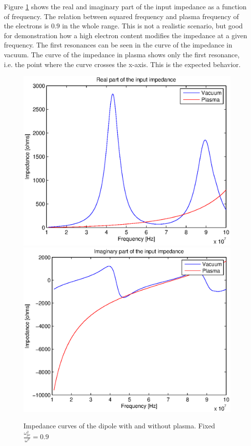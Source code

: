 \documentclass[a4paper,11pt]{thesis}
\begin{document}
Figure \ref{fig:imps_fixed} shows the real and imaginary part of the input impedance as a function of frequency. The relation between squared frequency and plasma frequency of the electrons is $0.9$ in the whole range. This is not a realistic scenario, but good for demonstration how a high electron content modifies the impedance at a given frequency. The first resonances can be seen in the curve of the impedance in vacuum. The curve of the impedance in plasma shows only the first resonance, i.e. the point where the curve crosses the x-axis. This is the expected behavior.\\



\begin{figure}
\begin{center}
 \includegraphics[width=11.5cm]{DissPics/impedance_dipole_fixed_rel.eps}
\includegraphics[width=11.5cm]{DissPics/impedance_dipole_fixed_rel_imag.eps}
 \caption{Impedance curves of the dipole with and without plasma. Fixed $\frac{\omega_{pe}^2}{\omega^2}=0.9$ }\label{fig:imps_fixed}
 \end{center}
\end{figure}
\end{document}
